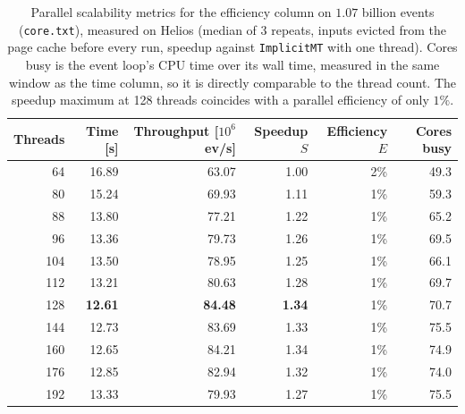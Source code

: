\begin{table}[htbp]
\centering
\caption{Parallel scalability metrics for the efficiency column on $1.07$ billion events (\texttt{core.txt}), measured on Helios (median of 3 repeats, inputs evicted from the page cache before every run, speedup against \texttt{ImplicitMT} with one thread). Cores busy is the event loop's CPU time over its wall time, measured in the same window as the time column, so it is directly comparable to the thread count. The speedup maximum at 128 threads coincides with a parallel efficiency of only $1\%$.}
\label{tab:scalability-efficiency}
\begin{tabular}{rrrrrr}
\toprule
Threads & Time [s] & Throughput [$10^6$ ev/s] & Speedup $S$ & Efficiency $E$ & Cores busy \\
\midrule
64 & 16.89 & 63.07 & 1.00 & 2\% & 49.3 \\
80 & 15.24 & 69.93 & 1.11 & 1\% & 59.3 \\
88 & 13.80 & 77.21 & 1.22 & 1\% & 65.2 \\
96 & 13.36 & 79.73 & 1.26 & 1\% & 69.5 \\
104 & 13.50 & 78.95 & 1.25 & 1\% & 66.1 \\
112 & 13.21 & 80.63 & 1.28 & 1\% & 69.7 \\
128 & \textbf{12.61} & \textbf{84.48} & \textbf{1.34} & 1\% & 70.7 \\
144 & 12.73 & 83.69 & 1.33 & 1\% & 75.5 \\
160 & 12.65 & 84.21 & 1.34 & 1\% & 74.9 \\
176 & 12.85 & 82.94 & 1.32 & 1\% & 74.0 \\
192 & 13.33 & 79.93 & 1.27 & 1\% & 75.5 \\
\bottomrule
\end{tabular}
\end{table}
